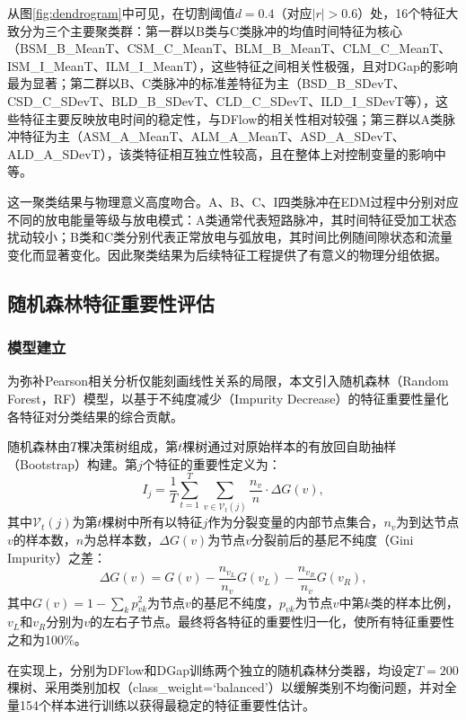 \documentclass[UTF8,a4paper,12pt]{ctexart}
\begin{document}
从图\ref{fig:dendrogram}中可见，在切割阈值$d=0.4$（对应$|r|>0.6$）处，16个特征大致分为三个主要聚类群：第一群以B类与C类脉冲的均值时间特征为核心（BSM\_B\_MeanT、CSM\_C\_MeanT、BLM\_B\_MeanT、CLM\_C\_MeanT、ISM\_I\_MeanT、ILM\_I\_MeanT），这些特征之间相关性极强，且对DGap的影响最为显著；第二群以B、C类脉冲的标准差特征为主（BSD\_B\_SDevT、CSD\_C\_SDevT、BLD\_B\_SDevT、CLD\_C\_SDevT、ILD\_I\_SDevT等），这些特征主要反映放电时间的稳定性，与DFlow的相关性相对较强；第三群以A类脉冲特征为主（ASM\_A\_MeanT、ALM\_A\_MeanT、ASD\_A\_SDevT、ALD\_A\_SDevT），该类特征相互独立性较高，且在整体上对控制变量的影响中等。

这一聚类结果与物理意义高度吻合。A、B、C、I四类脉冲在EDM过程中分别对应不同的放电能量等级与放电模式：A类通常代表短路脉冲，其时间特征受加工状态扰动较小；B类和C类分别代表正常放电与弧放电，其时间比例随间隙状态和流量变化而显著变化。因此聚类结果为后续特征工程提供了有意义的物理分组依据。

\subsection{随机森林特征重要性评估}

\subsubsection{模型建立}

为弥补Pearson相关分析仅能刻画线性关系的局限，本文引入随机森林（Random Forest，RF）模型，以基于不纯度减少（Impurity Decrease）的特征重要性量化各特征对分类结果的综合贡献。

随机森林由$T$棵决策树组成，第$t$棵树通过对原始样本的有放回自助抽样（Bootstrap）构建。第$j$个特征的重要性定义为：
\begin{equation}
I_j=\frac{1}{T}\sum_{t=1}^{T}\sum_{v\in\mathcal{V}_t(j)}\frac{n_v}{n}\cdot\Delta G(v),
\label{eq:rf_importance}
\end{equation}
其中$\mathcal{V}_t(j)$为第$t$棵树中所有以特征$j$作为分裂变量的内部节点集合，$n_v$为到达节点$v$的样本数，$n$为总样本数，$\Delta G(v)$为节点$v$分裂前后的基尼不纯度（Gini Impurity）之差：
\begin{equation}
\Delta G(v)=G(v)-\frac{n_{v_L}}{n_v}G(v_L)-\frac{n_{v_R}}{n_v}G(v_R),
\end{equation}
其中$G(v)=1-\sum_{k}p_{vk}^2$为节点$v$的基尼不纯度，$p_{vk}$为节点$v$中第$k$类的样本比例，$v_L$和$v_R$分别为$v$的左右子节点。最终将各特征的重要性归一化，使所有特征重要性之和为100\%。

在实现上，分别为DFlow和DGap训练两个独立的随机森林分类器，均设定$T=200$棵树、采用类别加权（class\_weight=`balanced'）以缓解类别不均衡问题，并对全量154个样本进行训练以获得最稳定的特征重要性估计。
\end{document}
